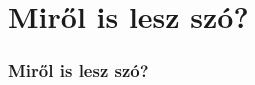 \documentclass{beamer}
\title{\vikcim}
\author{\vikszerzo \\ \texttt{\vikszerzomail} \\[0.5cm] Konzulens: \vikkonzulens}
\date{2012. június 14.}
\begin{document}
\begin{frame}[plain]
\titlepage
\end{frame}

\section{Miről is lesz szó?}
\begin{frame}
\frametitle{Miről is lesz szó?}
\end{frame}
\end{document}
